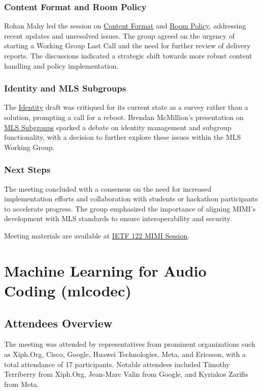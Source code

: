 \documentclass{article}
\begin{document}
\subsubsection{Content Format and Room Policy}
Rohan Mahy led the session on \href{https://www.ietf.org/archive/id/draft-ietf-mimi-content-04.html}{Content Format} and \href{https://www.ietf.org/archive/id/draft-mahy-mimi-room-policy-01.html}{Room Policy}, addressing recent updates and unresolved issues. The group agreed on the urgency of starting a Working Group Last Call and the need for further review of delivery reports. The discussions indicated a strategic shift towards more robust content handling and policy implementation.

\subsubsection{Identity and MLS Subgroups}
The \href{https://www.ietf.org/archive/id/draft-mahy-mimi-identity-03.html}{Identity} draft was critiqued for its current state as a survey rather than a solution, prompting a call for a reboot. Brendan McMillion's presentation on \href{https://datatracker.ietf.org/doc/draft-mcmillion-mls-subgroups/}{MLS Subgroups} sparked a debate on identity management and subgroup functionality, with a decision to further explore these issues within the MLS Working Group.

\subsubsection{Next Steps}
The meeting concluded with a consensus on the need for increased implementation efforts and collaboration with students or hackathon participants to accelerate progress. The group emphasized the importance of aligning MIMI's development with MLS standards to ensure interoperability and security.

Meeting materials are available at \href{https://datatracker.ietf.org/meeting/122/session/mimi}{IETF 122 MIMI Session}.



\newpage

\section{Machine Learning for Audio Coding (mlcodec)}

\subsection{Attendees Overview}
The meeting was attended by representatives from prominent organizations such as Xiph.Org, Cisco, Google, Huawei Technologies, Meta, and Ericsson, with a total attendance of 17 participants. Notable attendees included Timothy Terriberry from Xiph.Org, Jean-Marc Valin from Google, and Kyriakos Zarifis from Meta.
\end{document}

